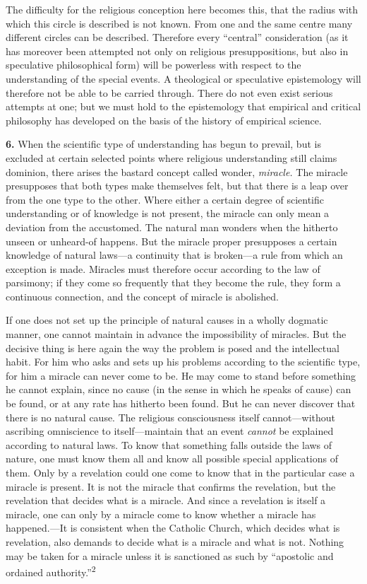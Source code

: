 \documentclass[12pt,a4paper]{book}
\newcommand{\opage}[1]{\marginnote{\footnotesize\textit{[#1]}}}
\begin{document}
The difficulty for the religious conception here becomes this, that the
radius with which this circle is described is not known. From one and
the same centre many different circles can be described. Therefore every
``central'' consideration (as it has moreover been attempted not only on
religious presuppositions, but also in speculative philosophical form)
will be powerless with respect to the understanding of the special
events. A theological or speculative epistemology will therefore not be
able to be carried through. There do not even exist serious attempts at
one; but we must hold to the epistemology that empirical and critical
philosophy has developed on the basis of the history of empirical
science.

\medskip

\noindent\textbf{6.} When the scientific type of understanding has begun
to prevail, but is excluded at certain selected points where religious
understanding still claims dominion, there arises the bastard concept
called wonder, \emph{miracle.} The miracle presupposes that both types
make themselves felt, but that there is a leap over from the one type to
the other. Where either a certain degree of scientific understanding or
of knowledge is not present, the miracle can only mean a deviation from
the accustomed. The natural man wonders when the hitherto unseen or
unheard-of happens. But the miracle proper presupposes a certain
knowledge of natural laws---a continuity that is broken---a rule from
which an exception is made. Miracles must therefore occur according to
the law of parsimony; if they come so frequently that they become the
rule, they form a continuous connection, and the concept of miracle is
abolished.

If one does not set up the principle of natural causes in a 
\opage{21}wholly dogmatic manner, one cannot maintain in advance the impossibility of
miracles. But the decisive thing is here again the way the problem is
posed and the intellectual habit. For him who asks and sets up his
problems according to the scientific type, for him a miracle can never
come to be. He may come to stand before something he cannot explain,
since no cause (in the sense in which he speaks of cause) can be found,
or at any rate has hitherto been found. But he can never discover that
there is no natural cause. The religious consciousness itself
cannot---without ascribing omniscience to itself---maintain that an
event \emph{cannot} be explained according to natural laws. To know that
something falls outside the laws of nature, one must know them all and
know all possible special applications of them. Only by a revelation
could one come to know that in the particular case a miracle is present.
It is not the miracle that confirms the revelation, but the revelation
that decides what is a miracle. And since a revelation is itself a
miracle, one can only by a miracle come to know whether a miracle has
happened.---It is consistent when the Catholic Church, which decides
what is revelation, also demands to decide what is a miracle and what is
not. Nothing may be taken for a miracle unless it is sanctioned as such
by ``apostolic and ordained authority.''\textsuperscript{2}
\end{document}
